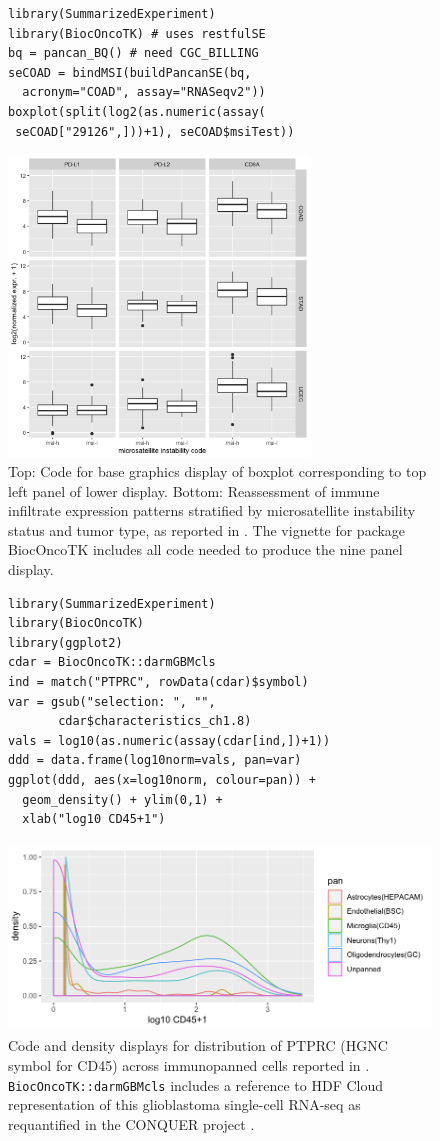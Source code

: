 \documentclass[applications]{gen-bioinformatics}
\begin{document}
\begin{figure}[bb]
\begin{verbatim}
library(SummarizedExperiment)
library(BiocOncoTK) # uses restfulSE
bq = pancan_BQ() # need CGC_BILLING
seCOAD = bindMSI(buildPancanSE(bq, 
  acronym="COAD", assay="RNASeqv2"))
boxplot(split(log2(as.numeric(assay(
 seCOAD["29126",]))+1), seCOAD$msiTest))
\end{verbatim}
\includegraphics[height=8.0cm]{imm3x3.png}
\caption{Top: Code for base graphics display of boxplot
corresponding to top left panel of lower display.
Bottom: Reassessment of immune infiltrate expression
patterns stratified by microsatellite instability
status and tumor type, as reported in \cite{Bailey2018}.
The vignette for package BiocOncoTK includes all
code needed to produce the nine panel display.}
\label{pancanPanel}
\end{figure}



\begin{figure}[bb]
\begin{verbatim}
library(SummarizedExperiment)
library(BiocOncoTK)
library(ggplot2)
cdar = BiocOncoTK::darmGBMcls
ind = match("PTPRC", rowData(cdar)$symbol)
var = gsub("selection: ", "", 
       cdar$characteristics_ch1.8)
vals = log10(as.numeric(assay(cdar[ind,])+1))
ddd = data.frame(log10norm=vals, pan=var)
ggplot(ddd, aes(x=log10norm, colour=pan)) + 
  geom_density() + ylim(0,1) + 
  xlab("log10 CD45+1")
\end{verbatim}
\includegraphics[height=5.0cm]{darmDens.png}
\caption{Code and density displays for
distribution of PTPRC (HGNC symbol for CD45) across immunopanned
cells reported in \cite{Darmanis2017}.
\texttt{BiocOncoTK::darmGBMcls} includes
a reference to HDF Cloud representation of
this glioblastoma single-cell RNA-seq
as requantified in the CONQUER project \citep{Soneson2018}.}
\label{hdffig}
\end{figure}
\end{document}
